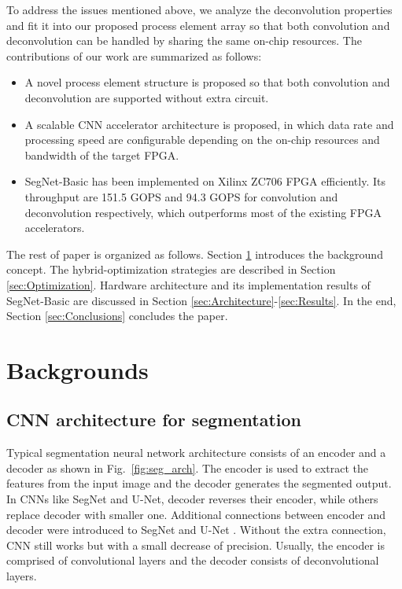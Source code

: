 \documentclass[conference]{IEEEtran}
\begin{document}
To address the issues mentioned above, we analyze the deconvolution properties and fit it into our proposed process element array so that both convolution and deconvolution can be handled by sharing the same on-chip resources. The contributions of our work are summarized as follows:

\begin{itemize}
	\item A novel process element structure is proposed so that both convolution and deconvolution are supported without extra circuit.
	\begin{comment}
	\textcolor{red}{Memory access is organized to boost the processing rate.}
	\end{comment}
	\item A scalable CNN accelerator architecture is proposed, in which data rate and processing speed are configurable depending on the on-chip resources and bandwidth of the target FPGA. 
	\item SegNet-Basic has been implemented on Xilinx ZC706 FPGA efficiently. Its throughput are 151.5 GOPS and 94.3 GOPS for convolution and deconvolution respectively, which outperforms most of the existing FPGA accelerators.
\end{itemize}

The rest of paper is organized as follows. Section \ref{sec:Backgrounds} introduces the background concept. The hybrid-optimization strategies are described in Section \ref{sec:Optimization}. Hardware architecture and its implementation results of SegNet-Basic are discussed in Section \ref{sec:Architecture}-\ref{sec:Results}. In the end, Section \ref{sec:Conclusions} concludes the paper. 

\section{Backgrounds}\label{sec:Backgrounds}
\subsection{CNN architecture for segmentation}
Typical segmentation neural network architecture consists of an encoder and a decoder as shown in Fig.~\ref{fig:seg_arch}. The encoder is used to extract the features from the input image and the decoder generates the segmented output. In CNNs like SegNet and U-Net, decoder reverses their encoder, while others replace decoder with smaller one. Additional connections between encoder and decoder were introduced to SegNet \cite{ref:segnet_2017} and U-Net \cite{ref:u-net_2015}. Without the extra connection, CNN still works but with a small decrease of precision. Usually, the encoder is comprised of convolutional layers and the decoder consists of deconvolutional layers.
\end{document}
